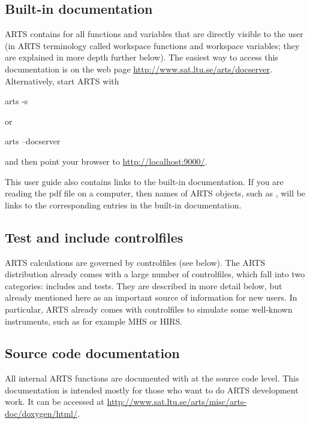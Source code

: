 \subsection{Built-in documentation}
\label{sec:built-in_doc}

ARTS contains  for all functions and
variables that are directly visible to the user (in ARTS terminology called
workspace functions and workspace variables; they are explained in more depth
further below).
The easiest way to access this documentation is on the web page
\url{http://www.sat.ltu.se/arts/docserver}. Alternatively, start ARTS with
\begin{code}
  arts -s
\end{code}
or
\begin{code}
  arts --docserver
\end{code}
and then point your browser to \url{http://localhost:9000/}.

This user guide also contains links to the built-in
documentation.  If you are reading the pdf file on a computer, then
names of ARTS objects, such as , will be links to
the corresponding entries in the built-in documentation. 

\subsection{Test and include controlfiles}

ARTS calculations are governed by controlfiles (see below). The ARTS
distribution already comes with a large number of controlfiles, which fall into
two categories: includes and tests. They are described in more detail below,
but already mentioned here as an important source of information for new users.
In particular, ARTS already comes with controlfiles to simulate some well-known
instruments, such as for example MHS or HIRS. \\

\subsection{Source code documentation}

All internal ARTS functions are documented with  at the
source code level. This documentation is intended mostly for those who want to
do ARTS development work. It can be accessed at
\url{http://www.sat.ltu.se/arts/misc/arts-doc/doxygen/html/}.

